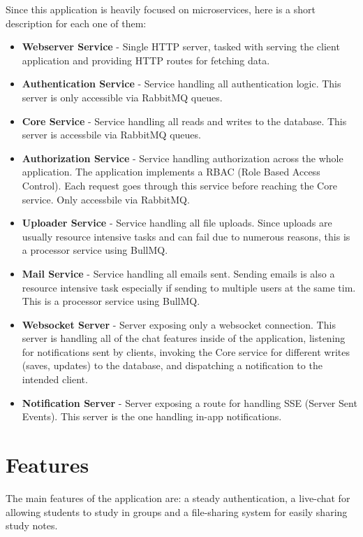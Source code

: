 Since this application is heavily focused on microservices, here is a short description for each one of them:
\begin{itemize}
    \item \textbf{Webserver Service} - Single HTTP\cite{HTTP} server, tasked with serving the client application and providing HTTP routes for fetching data.
    \item \textbf{Authentication Service} - Service handling all authentication logic. This server is only accessible via RabbitMQ queues.
    \item \textbf{Core Service} - Service handling all reads and writes to the database. This server is accessbile via RabbitMQ queues.
    \item \textbf{Authorization Service} - Service handling authorization across the whole application. The application implements a RBAC (Role Based Access Control)\cite{RBAC}. Each request goes through this service before reaching the Core service. Only accessbile via RabbitMQ.
    \item \textbf{Uploader Service} - Service handling all file uploads. Since uploads are usually resource intensive tasks and can fail due to numerous reasons, this is a processor service using BullMQ.
    \item \textbf{Mail Service} - Service handling all emails sent. Sending emails is also a resource intensive task especially if sending to multiple users at the same tim. This is a processor service using BullMQ.
    \item \textbf{Websocket Server} - Server exposing only a websocket connection. This server is handling all of the chat features inside of the application, listening for notifications sent by clients, invoking the Core service for different writes (saves, updates) to the database, and dispatching a notification to the intended client.
    \item \textbf{Notification Server} - Server exposing a route for handling SSE (Server Sent Events). This server is the one handling in-app notifications. 
\end{itemize}

\section{Features}
The main features of the application are: a steady authentication, a live-chat for allowing students to study in groups and a file-sharing system for easily sharing study notes.

